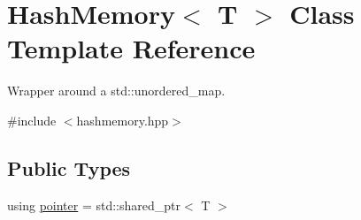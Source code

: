 \hypertarget{classHashMemory}{}\section{Hash\+Memory$<$ T $>$ Class Template Reference}
\label{classHashMemory}


Wrapper around a std\+::unordered\+\_\+map.  




{\ttfamily \#include $<$hashmemory.\+hpp$>$}

\subsection*{Public Types}
\begin{DoxyCompactItemize}
\item 
using \mbox{\hyperlink{classHashMemory_ab2c7ace63d7bbcf75d523c445a3a0dbb}{pointer}} = std\+::shared\+\_\+ptr$<$ T $>$
\end{DoxyCompactItemize}
